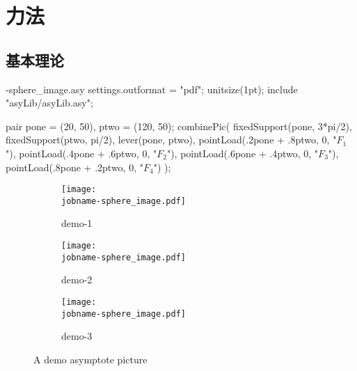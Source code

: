 \chapter{力法}

\section{基本理论}

\begin{filecontents*}{\jobname-sphere_image.asy}
settings.outformat = "pdf";
unitsize(1pt);
include "asyLib/asyLib.asy";

pair pone = (20, 50), ptwo = (120, 50);
combinePic(
    fixedSupport(pone, 3*pi/2),
    fixedSupport(ptwo, pi/2),
    lever(pone, ptwo),
    pointLoad(.2pone + .8ptwo, 0, "$F_1$"),
    pointLoad(.4pone + .6ptwo, 0, "$F_2$"),
    pointLoad(.6pone + .4ptwo, 0, "$F_3$"),
    pointLoad(.8pone + .2ptwo, 0, "$F_4$")
);
\end{filecontents*}

\begin{figure}[H]
\centering
\begin{subfigure}{.3\hsize}
    \centering
    \texttt{[image: \\jobname-sphere\_image.pdf]}
    \caption{demo-1}
\end{subfigure}
\begin{subfigure}{.3\hsize}
    \centering
    \texttt{[image: \\jobname-sphere\_image.pdf]}
    \caption{demo-2}
\end{subfigure}
\begin{subfigure}{.3\hsize}
    \centering
    \texttt{[image: \\jobname-sphere\_image.pdf]}
    \caption{demo-3}
\end{subfigure}
\caption{A demo asymptote picture}
\end{figure}